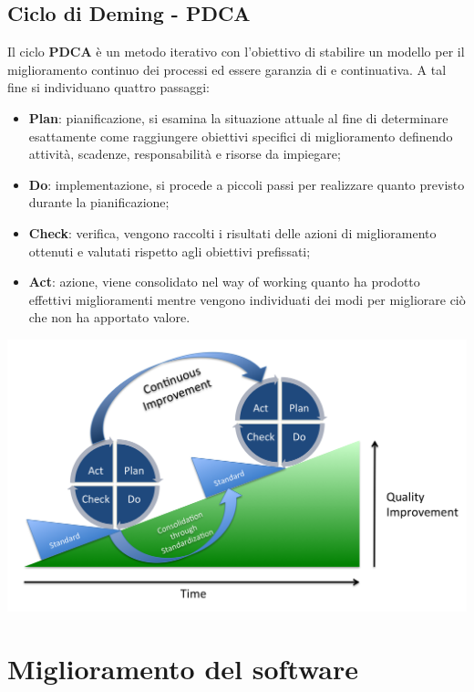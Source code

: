 \subsection{Ciclo di Deming - PDCA} \label{PDCA}
Il ciclo \textbf{PDCA} è un metodo iterativo con l'obiettivo di stabilire un modello per il miglioramento continuo dei processi ed essere garanzia di   e continuativa.
A tal fine si individuano quattro passaggi:
\begin{itemize}
	\item\textbf{Plan}: pianificazione, si esamina la situazione attuale al fine di determinare esattamente come raggiungere obiettivi specifici di miglioramento definendo attività, scadenze, responsabilità e risorse da impiegare;
	\item\textbf{Do}: implementazione, si procede a piccoli passi per realizzare quanto previsto durante la pianificazione;
	\item\textbf{Check}: verifica, vengono raccolti i risultati delle azioni di miglioramento ottenuti e valutati rispetto agli obiettivi prefissati;
	\item\textbf{Act}: azione, viene consolidato nel way of working quanto ha prodotto effettivi miglioramenti mentre vengono individuati dei modi per migliorare ciò che non ha apportato valore.
\end{itemize}
\begin{center}
\includegraphics[scale=0.25]{Immagini/PDCA.png}
\end{center}

\newpage
\section{Miglioramento del software}
